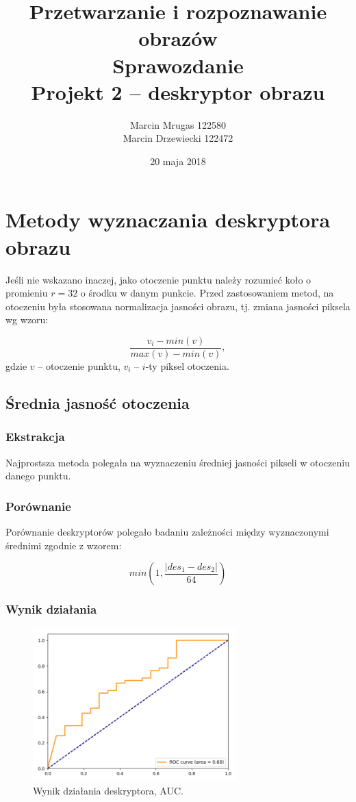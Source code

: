 \documentclass[a4paper,11pt]{article}
\author{Marcin Mrugas 122580 \\
		Marcin Drzewiecki 122472}
\title{Przetwarzanie i rozpoznawanie obrazów\\ 
\large{{\bf Sprawozdanie} \\ Projekt 2 -- deskryptor obrazu}}
\date{20 maja 2018}
\begin{document}
\maketitle 

\section{Metody wyznaczania deskryptora obrazu}

Jeśli nie wskazano inaczej, jako otoczenie punktu należy rozumieć koło o promieniu $ r = 32 $ o środku w danym punkcie.
Przed zastosowaniem metod, na otoczeniu była stosowana normalizacja jasności obrazu, tj. zmiana jasności piksela wg wzoru:

$$ \frac{v_i - min(v)}{max(v)-min(v)},$$
gdzie $v$ -- otoczenie punktu, $v_i$ -- $i$-ty piksel otoczenia.

\subsection{Średnia jasność otoczenia}

\subsubsection{Ekstrakcja}
Najprostsza metoda polegała na wyznaczeniu średniej jasności pikseli w otoczeniu danego punktu.

\subsubsection{Porównanie}
Porównanie deskryptorów polegało badaniu zależności między wyznaczonymi średnimi zgodnie z wzorem:

$$ min(1, \frac{|des_1 - des_2|}{64}) $$

\subsubsection{Wynik działania}

\begin{figure}[H]
\begin{center}
\includegraphics[width=0.7\textwidth]{./img/average.png}
\end{center}
\caption{Wynik działania deskryptora, AUC.}
\end{figure}
\end{document}
